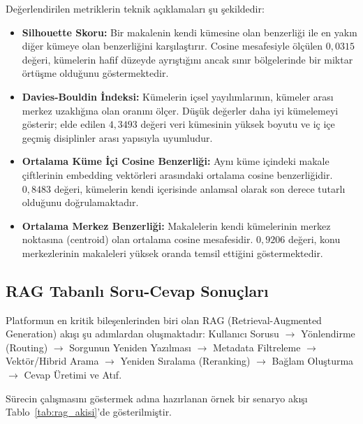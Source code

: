 Değerlendirilen metriklerin teknik açıklamaları şu şekildedir:
\begin{itemize}
    \item \textbf{Silhouette Skoru:} Bir makalenin kendi kümesine olan benzerliği ile en yakın diğer kümeye olan benzerliğini karşılaştırır. Cosine mesafesiyle ölçülen $0,0315$ değeri, kümelerin hafif düzeyde ayrıştığını ancak sınır bölgelerinde bir miktar örtüşme olduğunu göstermektedir.
    \item \textbf{Davies-Bouldin İndeksi:} Kümelerin içsel yayılımlarının, kümeler arası merkez uzaklığına olan oranını ölçer. Düşük değerler daha iyi kümelemeyi gösterir; elde edilen $4,3493$ değeri veri kümesinin yüksek boyutu ve iç içe geçmiş disiplinler arası yapısıyla uyumludur.
    \item \textbf{Ortalama Küme İçi Cosine Benzerliği:} Aynı küme içindeki makale çiftlerinin embedding vektörleri arasındaki ortalama cosine benzerliğidir. $0,8483$ değeri, kümelerin kendi içerisinde anlamsal olarak son derece tutarlı olduğunu doğrulamaktadır.
    \item \textbf{Ortalama Merkez Benzerliği:} Makalelerin kendi kümelerinin merkez noktasına (centroid) olan ortalama cosine mesafesidir. $0,9206$ değeri, konu merkezlerinin makaleleri yüksek oranda temsil ettiğini göstermektedir.
\end{itemize}

\subsection{RAG Tabanlı Soru-Cevap Sonuçları}
Platformun en kritik bileşenlerinden biri olan RAG (Retrieval-Augmented Generation) akışı şu adımlardan oluşmaktadır:
Kullanıcı Sorusu $\rightarrow$ Yönlendirme (Routing) $\rightarrow$ Sorgunun Yeniden Yazılması $\rightarrow$ Metadata Filtreleme $\rightarrow$ Vektör/Hibrid Arama $\rightarrow$ Yeniden Sıralama (Reranking) $\rightarrow$ Bağlam Oluşturma $\rightarrow$ Cevap Üretimi ve Atıf.

Sürecin çalışmasını göstermek adına hazırlanan örnek bir senaryo akışı Tablo~\ref{tab:rag_akisi}'de gösterilmiştir.

